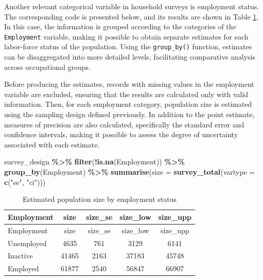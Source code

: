 \documentclass[
  english,
  12pt,
]{book}
\newenvironment{Shaded}{\begin{snugshade}}{\end{snugshade}}
\newcommand{\AttributeTok}[1]{\textcolor[rgb]{0.13,0.29,0.53}{#1}}
\newcommand{\FunctionTok}[1]{\textcolor[rgb]{0.13,0.29,0.53}{\textbf{#1}}}
\newcommand{\NormalTok}[1]{#1}
\newcommand{\SpecialCharTok}[1]{\textcolor[rgb]{0.81,0.36,0.00}{\textbf{#1}}}
\newcommand{\StringTok}[1]{\textcolor[rgb]{0.31,0.60,0.02}{#1}}
\begin{document}
Another relevant categorical variable in household surveys is employment status. The corresponding code is presented below, and its results are shown in Table \ref{tab:tab-tamano-empleo}. In this case, the information is grouped according to the categories of the \texttt{Employment} variable, making it possible to obtain separate estimates for each labor-force status of the population. Using the \texttt{group\_by()} function, estimates can be disaggregated into more detailed levels, facilitating comparative analysis across occupational groups.

Before producing the estimates, records with missing values in the employment variable are excluded, ensuring that the results are calculated only with valid information. Then, for each employment category, population size is estimated using the sampling design defined previously. In addition to the point estimate, measures of precision are also calculated, specifically the standard error and confidence intervals, making it possible to assess the degree of uncertainty associated with each estimate.

\begin{Shaded}
\begin{Highlighting}[]
\NormalTok{survey\_design }\SpecialCharTok{\%\textgreater{}\%}
  \FunctionTok{filter}\NormalTok{(}\SpecialCharTok{!}\FunctionTok{is.na}\NormalTok{(Employment)) }\SpecialCharTok{\%\textgreater{}\%}
  \FunctionTok{group\_by}\NormalTok{(Employment) }\SpecialCharTok{\%\textgreater{}\%}
  \FunctionTok{summarise}\NormalTok{(}\AttributeTok{size =} \FunctionTok{survey\_total}\NormalTok{(}\AttributeTok{vartype =} \FunctionTok{c}\NormalTok{(}\StringTok{"se"}\NormalTok{, }\StringTok{"ci"}\NormalTok{)))}
\end{Highlighting}
\end{Shaded}

\begin{longtable}[]{@{}lcccc@{}}
\caption{\label{tab:tab-tamano-empleo}Estimated population size by employment status}\tabularnewline
\toprule\noalign{}
Employment & size & size\_se & size\_low & size\_upp \\
\midrule\noalign{}
\endfirsthead
\toprule\noalign{}
Employment & size & size\_se & size\_low & size\_upp \\
\midrule\noalign{}
\endhead
\bottomrule\noalign{}
\endlastfoot
Unemployed & 4635 & 761 & 3129 & 6141 \\
Inactive & 41465 & 2163 & 37183 & 45748 \\
Employed & 61877 & 2540 & 56847 & 66907 \\
\end{longtable}
\end{document}
